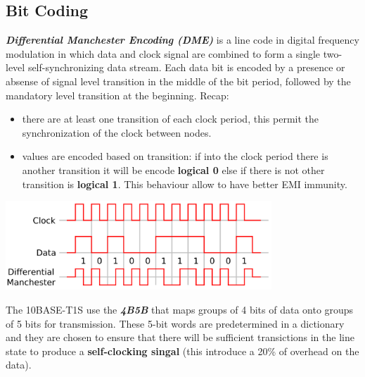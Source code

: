 \subsection{Bit Coding}
\begin{boxA}
    \textbf{\textit{Differential Manchester Encoding (DME)}} is a line code in digital frequency modulation in which data and clock signal are combined to form a single two-level self-synchronizing data stream. Each data bit is encoded by a presence or absense of signal level transition in the middle of the bit period, followed by the mandatory level transition at the beginning. Recap:
    \begin{itemize}[nosep]
        \item there are at least one transition of each clock period, this permit the synchronization of the clock between nodes.
        \item values are encoded based on transition: if into the clock period there is another transition it will be encode \textbf{logical 0} else if there is not other transition is \textbf{logical 1}. This behaviour allow to have better EMI immunity.
    \end{itemize}
    \begin{center}
        \includegraphics[width=0.75\textwidth]{img/dme}
    \end{center}
\end{boxA}

\newpage

The 10BASE-T1S use the \textbf{\textit{4B5B}} that maps groups of 4 bits of data onto groups of 5 bits for transmission. These 5-bit words are predetermined in a dictionary and they are chosen to ensure that there will be sufficient transictions in the line state to produce a \textbf{self-clocking singal} (this introduce a 20\% of overhead on the data).


